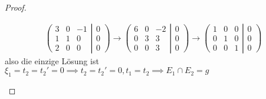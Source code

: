 \documentclass[prb,12pt]{revtex4-2}
\theoremstyle{definition}
\theoremstyle{definition}
\newenvironment{parts}{\begin{enumerate}[label=(\alph*)]}{\end{enumerate}}
\begin{document}
\begin{proof}
\begin{parts}
\begin{gather*}
	\left( \begin{matrix} 3 & 0 & -1 \\ 1 & 1 & 0 \\ 2 & 0 & 0\end{matrix}\right|\left.\begin{matrix}0 \\ 0 \\ 0\end{matrix}  \right)\to \left(\begin{matrix}6 & 0 & -2\\0 & 3 & 3\\0 & 0 & 3\end{matrix}\right|\left.\begin{matrix}0 \\ 0 \\ 0\end{matrix}\right)\to \left(\begin{matrix} 1 & 0 & 0 \\ 0 & 1 & 0 \\ 0 & 0 & 1\end{matrix}\right|\left. \begin{matrix}0 \\ 0 \\ 0\end{matrix}\right)
\end{gather*}
also die einzige Lösung ist $\xi_1=t_2=t_2'=0 \implies t_2=t_2'=0,t_1=t_2\implies E_1\cap E_2=g$ 


\end{parts}
\end{proof}
\end{document}
